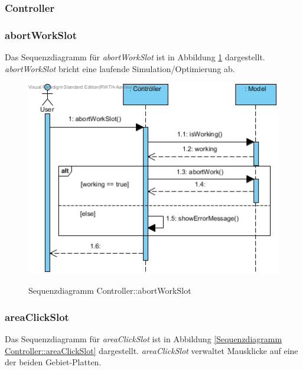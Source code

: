 \subsubsection{Controller}

\subsubsection*{abortWorkSlot}

Das Sequenzdiagramm für \emph{abortWorkSlot} ist in Abbildung \ref{Sequenzdiagramm Controller::abortWorkSlot} dargestellt. \emph{abortWorkSlot} bricht eine laufende Simulation/Optimierung ab.

\begin{figure}[H]
	\centering
	\includegraphics[scale=.6]{Bilder/Controller__abortWorkSlot().jpg}\\
	\caption{Sequenzdiagramm Controller::abortWorkSlot}
	\label{Sequenzdiagramm Controller::abortWorkSlot}
\end{figure}

\subsubsection*{areaClickSlot}

Das Sequenzdiagramm für \emph{areaClickSlot} ist in Abbildung \ref{Sequenzdiagramm Controller::areaClickSlot} dargestellt. \emph{areaClickSlot} verwaltet Mausklicke auf eine der beiden Gebiet-Platten.

